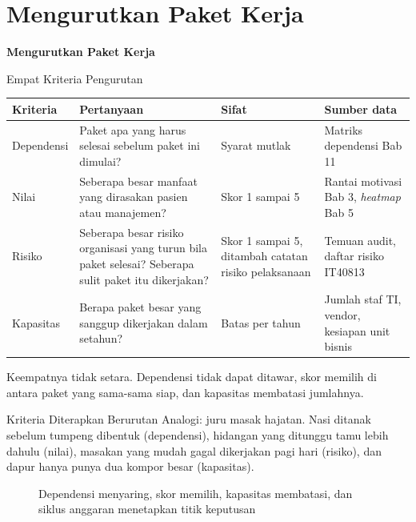 \documentclass[aspectratio=169, table, 12pt]{beamer}
\begin{document}
\section{Mengurutkan Paket Kerja}

\begin{frame}{\hfill}
  \centering
  \Huge{\textbf{Mengurutkan Paket Kerja}}
\end{frame}

\begin{frame}{{\Large Empat Kriteria Pengurutan}}
  \scriptsize
  \begin{tabularx}{\textwidth}{L{1.6cm}YL{2.8cm}L{3.0cm}}
    \hline
    \textbf{Kriteria} & \textbf{Pertanyaan} & \textbf{Sifat} & \textbf{Sumber data} \\
    \hline
    Dependensi & Paket apa yang harus selesai sebelum paket ini dimulai? &
      Syarat mutlak & Matriks dependensi Bab 11 \\
    \hline
    Nilai & Seberapa besar manfaat yang dirasakan pasien atau manajemen? &
      Skor 1 sampai 5 & Rantai motivasi Bab 3, \textit{heatmap} Bab 5 \\
    \hline
    Risiko & Seberapa besar risiko organisasi yang turun bila paket selesai?
      Seberapa sulit paket itu dikerjakan? & Skor 1 sampai 5, ditambah
      catatan risiko pelaksanaan & Temuan audit, daftar risiko IT40813 \\
    \hline
    Kapasitas & Berapa paket besar yang sanggup dikerjakan dalam setahun? &
      Batas per tahun & Jumlah staf TI, vendor, kesiapan unit bisnis \\
    \hline
  \end{tabularx}

  \vspace{6pt}
  \small Keempatnya tidak setara. Dependensi tidak dapat ditawar, skor memilih di antara paket yang
  sama-sama siap, dan kapasitas membatasi jumlahnya.
\end{frame}

\begin{frame}{{\Large Kriteria Diterapkan Berurutan}}
  \small Analogi: juru masak hajatan. Nasi ditanak sebelum tumpeng dibentuk (dependensi), hidangan yang
  ditunggu tamu lebih dahulu (nilai), masakan yang mudah gagal dikerjakan pagi hari (risiko), dan
  dapur hanya punya dua kompor besar (kapasitas).

  \centering
  \begin{figure}
    \resizebox{0.94\textwidth}{!}{}
    \caption{Dependensi menyaring, skor memilih, kapasitas membatasi, dan siklus anggaran menetapkan
             titik keputusan}
  \end{figure}
\end{frame}
\end{document}
